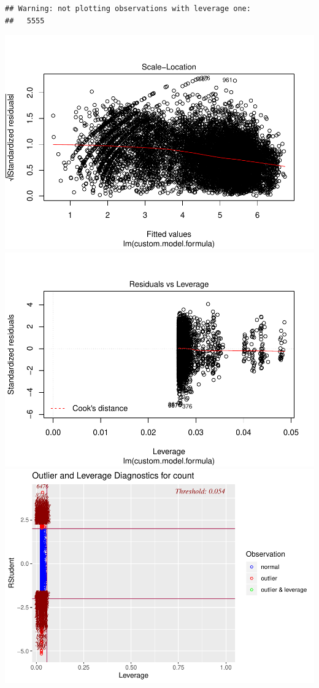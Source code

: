 \documentclass[american,]{article}
\begin{document}
\begin{verbatim}
## Warning: not plotting observations with leverage one:
##   5555
\end{verbatim}

\includegraphics{BikeSharingDemand_files/figure-latex/custom-model-3.pdf} \includegraphics{BikeSharingDemand_files/figure-latex/custom-model-4.pdf} \includegraphics{BikeSharingDemand_files/figure-latex/custom-model-5.pdf}
\end{document}
